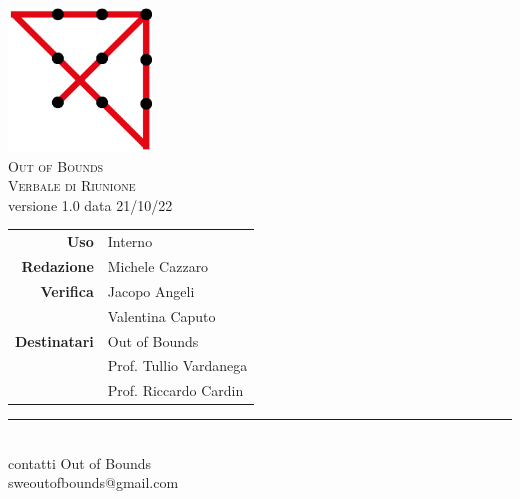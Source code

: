 
\thispagestyle{empty}
\setcounter{page}{0}

\begin{center}





\includegraphics[width=1.5in,height=1.5in]{logov2.png}\\
\Large
\textsc{Out of Bounds}\\

\vspace{1cm}
\textsc{Verbale di Riunione}\\
versione 1.0 data 21/10/22\\

\vspace{4cm}

\begin{tabular}{r|l}
    \textbf{Uso}            &  Interno\\
    \textbf{Redazione}      &  Michele Cazzaro\\
    \textbf{Verifica}       &  Jacopo Angeli\\
                            &  Valentina Caputo\\
    \textbf{Destinatari}    &  Out of Bounds\\
    \textbf{}               &  Prof. Tullio Vardanega\\
    \textbf{}               &  Prof. Riccardo Cardin\\
    
\end{tabular}

\vfill


\normalsize
\rule{8cm}{0.1mm}\\
\bigskip
contatti Out of Bounds\\
sweoutofbounds@gmail.com
\end{center}